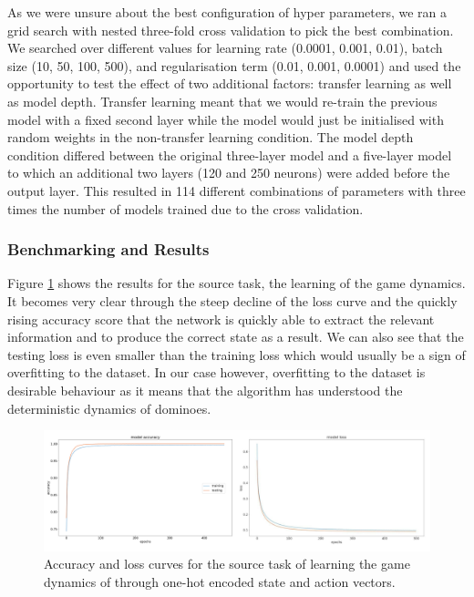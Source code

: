 \documentclass[12pt,a4paper]{article}
\begin{document}
As we were unsure about the best configuration of hyper parameters, we ran a grid search with nested three-fold cross validation to pick the best combination. We searched over different values for learning rate (0.0001, 0.001, 0.01), batch size (10, 50, 100, 500), and regularisation term (0.01, 0.001, 0.0001) and used the opportunity to test the effect of two additional factors: transfer learning as well as model depth. Transfer learning meant that we would re-train the previous model with a fixed second layer while the model would just be initialised with random weights in the non-transfer learning condition. The model depth condition differed between the original three-layer model and a five-layer model to which an additional two layers (120 and 250 neurons) were added before the output layer. This resulted in 114 different combinations of parameters with three times the number of models trained due to the cross validation.

\subsubsection{Benchmarking and Results}
Figure \ref{fig:src_tsk} shows the results for the source task, the learning of the game dynamics. It becomes very clear through the steep decline of the loss curve and the quickly rising accuracy score that the network is quickly able to extract the relevant information and to produce the correct state as a result. We can also see that the testing loss is even smaller than the training loss which would usually be a sign of overfitting to the dataset. In our case however, overfitting to the dataset is desirable behaviour as it means that the algorithm has understood the deterministic dynamics of dominoes. 

\begin{figure}
  \includegraphics[width=15cm]{img/src_tsk.png}
  \centering 
  \caption{Accuracy and loss curves for the source task of learning the game dynamics of through one-hot encoded state and action vectors.}
  \label{fig:src_tsk}
\end{figure}
\end{document}
